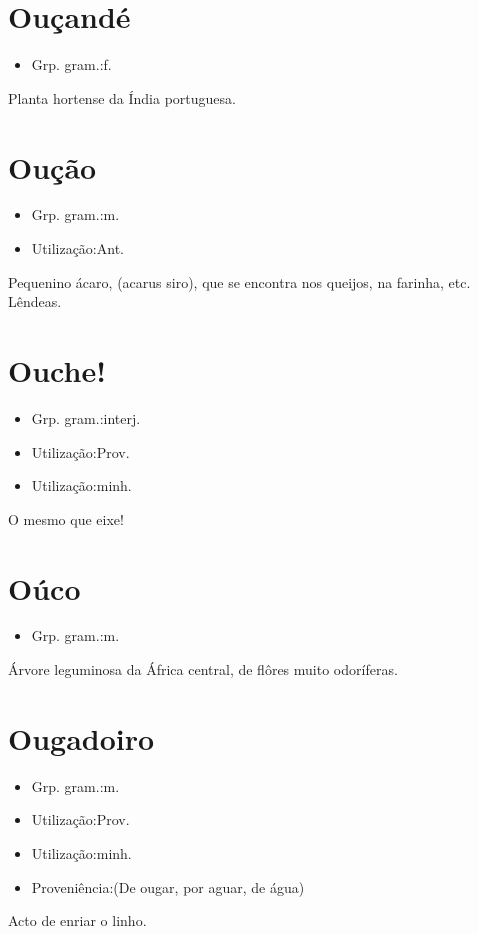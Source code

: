 \section{Ouçandé}
\begin{itemize}
\item {Grp. gram.:f.}
\end{itemize}
Planta hortense da Índia portuguesa.
\section{Oução}
\begin{itemize}
\item {Grp. gram.:m.}
\end{itemize}
\begin{itemize}
\item {Utilização:Ant.}
\end{itemize}
Pequenino ácaro, (\textunderscore acarus siro\textunderscore ), que se encontra nos queijos, na farinha, etc.
Lêndeas.
\section{Ouche!}
\begin{itemize}
\item {Grp. gram.:interj.}
\end{itemize}
\begin{itemize}
\item {Utilização:Prov.}
\end{itemize}
\begin{itemize}
\item {Utilização:minh.}
\end{itemize}
O mesmo que \textunderscore eixe!\textunderscore 
\section{Oúco}
\begin{itemize}
\item {Grp. gram.:m.}
\end{itemize}
Árvore leguminosa da África central, de flôres muito odoríferas.
\section{Ougadoiro}
\begin{itemize}
\item {Grp. gram.:m.}
\end{itemize}
\begin{itemize}
\item {Utilização:Prov.}
\end{itemize}
\begin{itemize}
\item {Utilização:minh.}
\end{itemize}
\begin{itemize}
\item {Proveniência:(De \textunderscore ougar\textunderscore , por \textunderscore aguar\textunderscore , de \textunderscore água\textunderscore )}
\end{itemize}
Acto de enriar o linho.
